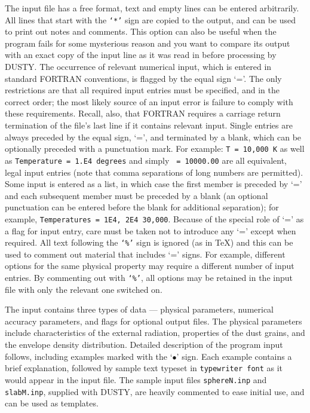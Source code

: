 \documentclass[11pt]{article}
\def\D  {{\sf DUSTY}}
\begin{document}
The input file has a free format, text and empty lines can be entered
arbitrarily. All lines that start with the {\tt `*'} sign are copied to the
output, and can be used to print out notes and comments. This option can also
be useful when the program fails for some mysterious reason and you want to
compare its output with an exact copy of the input line as it was read in
before processing by \D. The occurrence of relevant numerical input, which is
entered in standard FORTRAN conventions, is flagged by the equal sign `='. The
only restrictions are that all required input entries must be specified, and in
the correct order; the most likely source of an input error is failure to
comply with these requirements.  Recall, also, that FORTRAN requires a carriage
return termination of the file's last line if it contains relevant input.
Single entries are always preceded by the equal sign, `=', and terminated by a
blank, which can be optionally preceded with a punctuation mark.  For example:
{\tt T = 10,000 K} as well as {\tt Temperature = 1.E4 degrees} and simply {\tt
{} = 10000.00} are all equivalent, legal input entries (note that comma
separations of long numbers are permitted).  Some input is entered as a list,
in which case the first member is preceded by `=' and each subsequent member
must be preceded by a blank (an optional punctuation can be entered before the
blank for additional separation); for example, {\tt Temperatures  = 1E4, 2E4
30,000}. Because of the special role of `=' as a flag for input entry, care
must be taken not to introduce any `=' except when required.  All text
following the {\tt `\%'} sign is ignored (as in \TeX) and this can be used to
comment out material that includes `=' signs.  For example, different options
for the same physical property may require a different number of input entries.
By commenting out with {\tt `\%'}, all options may be retained in the input
file with only the relevant one switched on.

The input contains three types of data --- physical parameters, numerical
accuracy parameters, and flags for optional output files.  The physical
parameters include characteristics of the external radiation, properties of the
dust grains, and the envelope density distribution.  Detailed description of
the program input follows, including examples marked with the `$\bullet$' sign.
Each example contains a brief explanation, followed by sample text typeset in
{\tt typewriter font} as it would appear in the input file. The sample input
files {\tt sphereN.inp} and {\tt slabM.inp}, supplied with \D, are heavily
commented to ease initial use, and can be used as templates.
\end{document}
